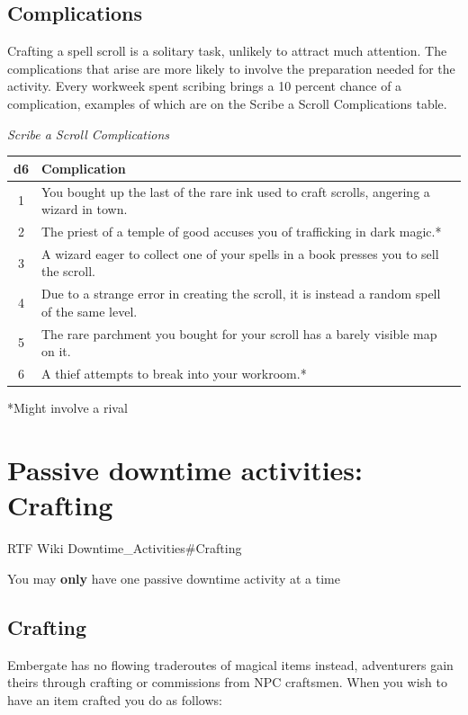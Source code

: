 \documentclass{article}
\begin{document}
    \subsection*{Complications}

    Crafting a spell scroll is a solitary task, unlikely to attract much attention. The complications that arise are more likely to involve the preparation needed for the activity. Every workweek spent scribing brings a 10 percent chance of a complication, examples of which are on the Scribe a Scroll Complications table.
    
    \large \textit{Scribe a Scroll Complications} \normalsize


    \begin{tabular}{|cl|}
        \hline
        d6&	Complication\\
        \hline
        1&	You bought up the last of the rare ink used to craft scrolls, angering a wizard in town.\\
        \hline
        2&	The priest of a temple of good accuses you of trafficking in dark magic.*\\
        \hline
        3&	A wizard eager to collect one of your spells in a book presses you to sell the scroll.\\
        \hline
        4&	Due to a strange error in creating the scroll, it is instead a random spell of the same level.\\
        \hline
        5&	The rare parchment you bought for your scroll has a barely visible map on it.\\
        \hline
        6&	A thief attempts to break into your workroom.*\\
        \hline
    \end{tabular}
    *Might involve a rival

    \section*{Passive downtime activities: Crafting}
    RTF Wiki 
    Downtime\_Activities\#Crafting

    You may \textbf{only} have one passive downtime activity at a time

    \subsection*{Crafting}

    Embergate has no flowing traderoutes of magical items instead, adventurers gain theirs through crafting or commissions from NPC craftsmen. When you wish to have an item crafted you do as follows: 
\end{document}

